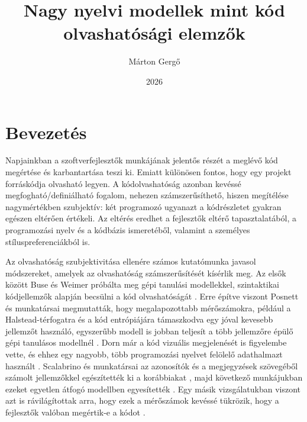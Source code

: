 \documentclass[
]{elteikthesis}[2024/04/26]
\title{Nagy nyelvi modellek mint kód olvashatósági elemzők}
\date{2026}
\author{Márton Gergő}
\affiliation{egyetemi tanársegéd}
\begin{document}

\maketitle



\tableofcontents
\cleardoublepage

\chapter{Bevezetés}
\label{ch:intro}

Napjainkban a szoftverfejlesztők munkájának jelentős részét a meglévő kód
megértése és karbantartása teszi ki. Emiatt különösen fontos, hogy egy projekt
forráskódja olvasható legyen. A kódolvashatóság azonban kevéssé megfogható/definiálható fogalom,
nehezen számszerűsíthető, hiszen megítélése nagymértékben szubjektív: két programozó
ugyanazt a kódrészletet gyakran egészen eltérően értékeli. Az eltérés eredhet a
fejlesztők eltérő tapasztalatából,
a programozási nyelv és a kódbázis ismeretéből, valamint a személyes
stíluspreferenciákból is.

Az olvashatóság szubjektivitása ellenére számos kutatómunka javasol módszereket,
amelyek az olvashatóság számszerűsítését kísérlik meg. Az elsők között Buse és
Weimer próbálta meg gépi tanulási modellekkel, szintaktikai kódjellemzők alapján
becsülni a kód olvashatóságát \cite{buse2008metric}. Erre építve viszont Posnett
és munkatársai megmutatták, hogy megalapozottabb mérőszámokra, például a
Halstead-térfogatra és a kód entrópiájára támaszkodva egy jóval kevesebb
jellemzőt használó, egyszerűbb modell is jobban teljesít a több jellemzőre épülő
gépi tanulásos modellnél \cite{posnett2011simpler}. %
Dorn már a kód vizuális megjelenését is figyelembe vette, és ehhez egy nagyobb,
több programozási nyelvet felölelő adathalmazt használt \cite{dorn2012general}. %
Scalabrino és munkatársai az azonosítók és a megjegyzések szövegéből számolt
jellemzőkkel egészítették ki a korábbiakat \cite{scalabrino2016improving}, majd
következő munkájukban ezeket egyetlen átfogó modellben egyesítették
\cite{scalabrino2018comprehensive}. Egy másik vizsgálatukban viszont azt is
rávilágítottak arra,
hogy ezek a mérőszámok kevéssé tükrözik, hogy a fejlesztők valóban megértik-e a
kódot \cite{scalabrino2017understandability}.
\end{document}
